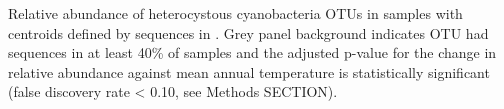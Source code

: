 Relative abundance of heterocystous cyanobacteria OTUs in \citet{Garcia_Pichel_2013} samples with centroids defined by sequences in \citet{Yeager}. Grey panel background indicates OTU had sequences in at least 40\% of samples and the adjusted p-value for the change in relative abundance against mean annual temperature is statistically significant (false discovery rate < 0.10, see Methods SECTION).